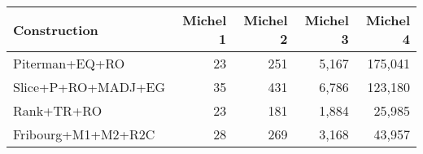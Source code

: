 \begin{tabular}{lrrrr}
  \hline
Construction & Michel 1 & Michel 2 & Michel 3 & Michel 4 \\ 
  \hline
Piterman+EQ+RO & 23 & 251 & 5,167 & 175,041 \\ 
  Slice+P+RO+MADJ+EG & 35 & 431 & 6,786 & 123,180 \\ 
  Rank+TR+RO & 23 & 181 & 1,884 & 25,985 \\ 
  Fribourg+M1+M2+R2C & 28 & 269 & 3,168 & 43,957 \\ 
   \hline
\end{tabular}
